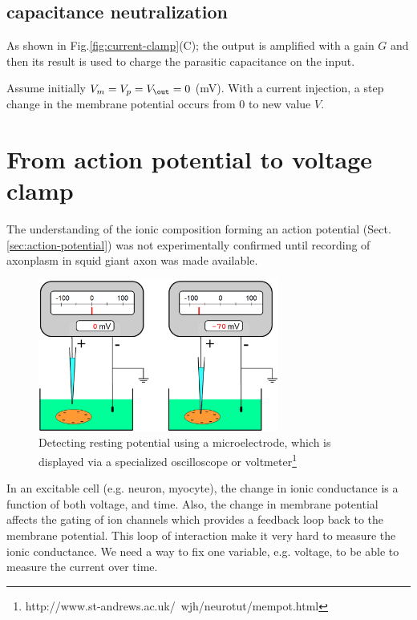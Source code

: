 \subsection{capacitance neutralization}
\label{sec:capacitance-neutralization}

As shown in Fig.\ref{fig:current-clamp}(C); the output is amplified with a
gain $G$  and then its result is used to charge the parasitic capacitance on the
input.

Assume initially $V_m = V_p = V_\out = 0$ (mV). With a current injection, a step
change in the membrane potential occurs from 0 to new value $V$.



\section{From action potential to voltage clamp}
\label{sec:from-acti-potent}

The understanding of the ionic composition forming an action potential
(Sect.\ref{sec:action-potential}) was not experimentally confirmed until
recording of axonplasm in squid giant axon was made available.

\begin{figure}[hbt]
  \centerline{\includegraphics[height=5cm,
    angle=0]{./images/electrode_Vrest.eps}}
  \caption{Detecting resting potential using a microelectrode, which is
  displayed via a specialized oscilloscope or
  voltmeter\footnote{http://www.st-andrews.ac.uk/~wjh/neurotut/mempot.html}}
  \label{fig:microelectrode}
\end{figure}

In an excitable cell (e.g. neuron, myocyte), the change in ionic conductance is
a function of both voltage, and time. Also, the change in membrane potential
affects the gating of ion channels which provides a feedback loop back to the
membrane potential. This loop of interaction make it very hard to measure the
ionic conductance. We need a way to fix one variable, e.g. voltage, to be able
to measure the current over time.

